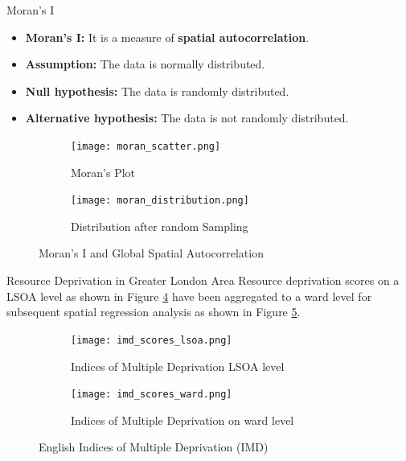 \documentclass[10pt, aspectratio=169]{beamer}
\begin{document}
\begin{frame}{Moran's I}

    \begin{itemize}
        \item \textbf{Moran's I:} It is a measure of \textbf{spatial autocorrelation}.
        \item \textbf{Assumption:} The data is normally distributed.
        \item \textbf{Null hypothesis:} The data is randomly distributed.
        \item \textbf{Alternative hypothesis:} The data is not randomly distributed.
    \end{itemize}
    \begin{figure}
        \centering
            \begin{subfigure}[t]{0.4\textwidth}
                \texttt{[image: moran\_scatter.png]}
                \caption{Moran's Plot}\label{fig:moran_scatter}
            \end{subfigure}
            \begin{subfigure}[t]{0.4\textwidth}
                \texttt{[image: moran\_distribution.png]}
                \caption{Distribution after random Sampling}\label{fig:moran_distribution}
            \end{subfigure}
        \caption{Moran's I and Global Spatial Autocorrelation}\label{fig:moran}
    \end{figure}
\end{frame}

\begin{frame}{Resource Deprivation in Greater London Area}
    Resource deprivation scores on a LSOA level as shown in Figure \ref{fig:imd_scores_lsoa}
    have been aggregated to a ward level for subsequent spatial regression analysis
    as shown in Figure \ref{fig:imd_scores_ward}.
    \begin{figure}
        \centering
            \begin{subfigure}[t]{0.4\textwidth}
                \texttt{[image: imd\_scores\_lsoa.png]}
                \caption{Indices of Multiple Deprivation LSOA level}\label{fig:imd_scores_lsoa}
            \end{subfigure}
            \begin{subfigure}[t]{0.4\textwidth}
                \texttt{[image: imd\_scores\_ward.png]}
                \caption{Indices of Multiple Deprivation on ward level}\label{fig:imd_scores_ward}
            \end{subfigure}
        \caption{English Indices of Multiple Deprivation (IMD)}\label{fig:imd}
    \end{figure}
\end{frame}
\end{document}
